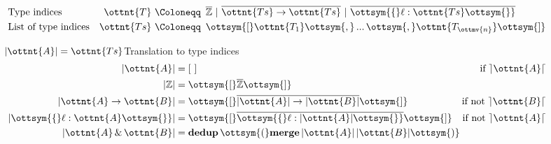 \begin{figure}[b!]
  \small
  \begin{align*}
    &\text{Type indices}        &\ottnt{T} ~\Coloneqq&~\,  \overline{\mathbb{Z} }  ~|~  \overline{ \ottnt{Ts} \rightarrow \ottnt{Ts} }  ~|~  \overline{  \ottsym{\{}   \ell   :   \ottnt{Ts}   \ottsym{\}}  }  \\
    &\text{List of type indices}&\ottnt{Ts}~\Coloneqq&~\, \ottsym{[}  \ottnt{T_{{\mathrm{1}}}}  \ottsym{,} \, ... \, \ottsym{,}  \ottnt{T_{\ottmv{n}}}  \ottsym{]} \\
  \end{align*}

  \begin{minipage}{0.4\textwidth}
  \begin{rulesection}{$ | \ottnt{A} |  = \ottnt{Ts}$}{Translation to type indices}
  \begin{align*}
     | \ottnt{A} |  &=  [~]  &\text{if $ \rceil \ottnt{A} \lceil $} \\ %
     |  \mathbb{Z}  |  &= \ottsym{[}   \overline{\mathbb{Z} }   \ottsym{]} &\\
     | \ottnt{A}  \rightarrow  \ottnt{B} |  &= \ottsym{[}   \overline{  | \ottnt{A} |  \rightarrow  | \ottnt{B} |  }   \ottsym{]} &\text{if not $ \rceil \ottnt{B} \lceil $}\\%
     | \ottsym{\{}  \ell  :  \ottnt{A}  \ottsym{\}} |  &= \ottsym{[}   \overline{  \ottsym{\{}   \ell   :    | \ottnt{A} |    \ottsym{\}}  }   \ottsym{]} &\text{if not $ \rceil \ottnt{A} \lceil $}\\ %
     | \ottnt{A}  \, {\&} \,  \ottnt{B} |  &= \textbf{dedup} \, \ottsym{(}  \textbf{merge} \,  | \ottnt{A} |  \,  | \ottnt{B} |   \ottsym{)} \hspace*{-1cm}&
  \end{align*}
  \end{rulesection}
  \end{minipage}
  \hfill
  \begin{minipage}{0.5\textwidth}

\end{minipage}
\end{figure}
